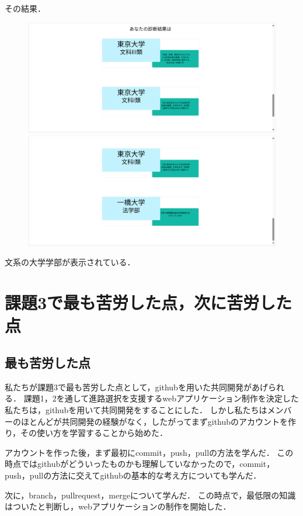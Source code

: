 \documentclass[a4j, titlepage]{jarticle}
\begin{document}
\begin{itemize}
\begin{figure}[h]
\end{figure}
その結果．
\begin{figure}[h]
\includegraphics{dousakekka-12.png}
\includegraphics{dousakekka-13.png}
\end{figure}
文系の大学学部が表示されている．

\section{課題3で最も苦労した点，次に苦労した点}
\subsection{最も苦労した点}

私たちが課題3で最も苦労した点として，githubを用いた共同開発があげられる．
課題1，2を通して進路選択を支援するwebアプリケーション制作を決定した私たちは，githubを用いて共同開発をすることにした．
しかし私たちはメンバーのほとんどが共同開発の経験がなく，したがってまずgithubのアカウントを作り，その使い方を学習することから始めた．

アカウントを作った後，まず最初にcommit，push，pullの方法を学んだ．
この時点ではgithubがどういったものかも理解していなかったので，commit，push，pullの方法に交えてgithubの基本的な考え方についても学んだ．

次に，branch，pullrequest，mergeについて学んだ．
この時点で，最低限の知識はついたと判断し，webアプリケーションの制作を開始した．


\end{itemize}
\end{document}
